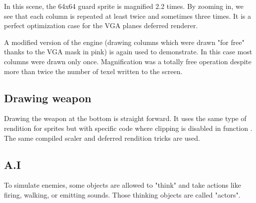 \par
\begin{figure}[H]
 \centering
\end{figure}
In this scene, the 64x64 guard sprite is magnified 2.2 times. By zooming in, we see that each column is repeated at least twice and sometimes three times. It is a perfect optimization case for the VGA planes deferred renderer.\\
\par
A modified version of the engine (drawing columns which were drawn "for free" thanks to the VGA mask in pink) is again used to demonstrate.  In this case most columns were drawn only once. Magnification was a totally free operation despite more than twice the number of texel written to the screen.\\

\par
\begin{figure}[H]
 \centering
\end{figure}
\begin{figure}[H]
 \centering
\end{figure}






\subsection{Drawing weapon}
Drawing the weapon at the bottom is straight forward. It uses the same type of rendition for sprites but with specific code where clipping is disabled in function . The same compiled scaler and deferred rendition tricks are used.














\subsection{A.I}
To simulate enemies, some objects are allowed to "think" and take actions like firing, walking, or emitting sounds. Those thinking objects are called "actors".\\
\par






